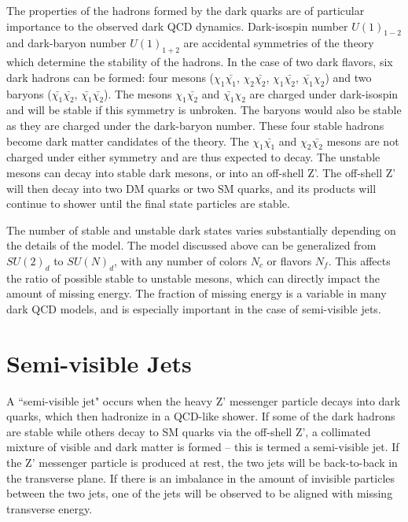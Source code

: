 The properties of the hadrons formed by the dark quarks are of particular importance to the observed dark QCD dynamics. Dark-isospin number $U(1)_{1-2}$ and dark-baryon number $U(1)_{1+2}$ are accidental symmetries of the theory which determine the stability of the hadrons. In the case of two dark flavors, six dark hadrons can be formed: four mesons ($\chi_1\bar{\chi_1}$, $\chi_2\bar{\chi_2}$, $\chi_1\bar{\chi_2}$, $\bar{\chi_1}\chi_2$) and two baryons ($\bar{\chi_1}\bar{\chi_2}$, $\bar{\chi_1}\bar{\chi_2}$). The mesons $\chi_1\bar{\chi_2}$ and $\bar{\chi_1}\chi_2$ are charged under dark-isospin and will be stable if this symmetry is unbroken. The baryons would also be stable as they are charged under the dark-baryon number. These four stable hadrons become dark matter candidates of the theory. The $\chi_1\bar{\chi_1}$ and $\chi_2\bar{\chi_2}$ mesons are not charged under either symmetry and are thus expected to decay. The unstable mesons can decay into stable dark mesons, or into an off-shell Z'. The off-shell Z' will then decay into two DM quarks or two SM quarks, and its products will continue to shower until the final state particles are stable.\par

The number of stable and unstable dark states varies substantially depending on the details of the model. The model discussed above can be generalized from $SU(2)_d$ to $SU(N)_d$, with any number of colors $N_c$ or flavors $N_f$. This affects the ratio of possible stable to unstable mesons, which can directly impact the amount of missing energy. The fraction of missing energy is a variable in many dark QCD models, and is especially important in the case of semi-visible jets.

\section{Semi-visible Jets}
\label{sec:semivisiblejets}

A ``semi-visible jet" occurs when the heavy Z' messenger particle decays into dark quarks, which then hadronize in a QCD-like shower. If some of the dark hadrons are stable while others decay to SM quarks via the off-shell Z', a collimated mixture of visible and dark matter is formed – this is termed a semi-visible jet. If the Z' messenger particle is produced at rest, the two jets will be back-to-back in the transverse plane. If there is an imbalance in the amount of invisible particles between the two jets, one of the jets will be observed to be aligned with missing transverse energy. \par

